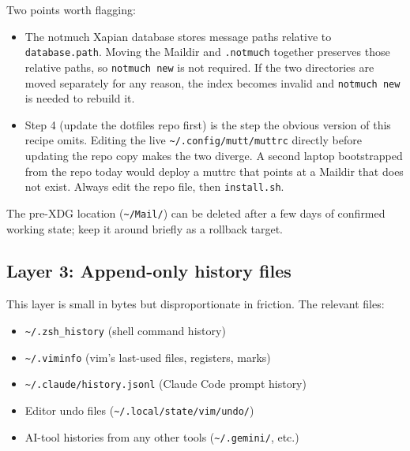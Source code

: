 \documentclass[
  11pt,
  letterpaper,
  DIV=11,
  numbers=noendperiod]{scrartcl}
\newenvironment{Shaded}{\begin{snugshade}}{\end{snugshade}}
\newcommand{\CommentTok}[1]{\textcolor[rgb]{0.37,0.37,0.37}{#1}}
\newcommand{\DataTypeTok}[1]{\textcolor[rgb]{0.68,0.00,0.00}{#1}}
\newcommand{\ExtensionTok}[1]{\textcolor[rgb]{0.00,0.23,0.31}{#1}}
\newcommand{\NormalTok}[1]{\textcolor[rgb]{0.00,0.23,0.31}{#1}}
\newcommand{\StringTok}[1]{\textcolor[rgb]{0.13,0.47,0.30}{#1}}
\newcommand{\VariableTok}[1]{\textcolor[rgb]{0.07,0.07,0.07}{#1}}
\providecommand{\tightlist}{%
  \setlength{\itemsep}{0pt}\setlength{\parskip}{0pt}}\usepackage{longtable,booktabs,array}
\begin{document}
\begin{Shaded}
\end{Shaded}

Two points worth flagging:

\begin{itemize}
\tightlist
\item
  The notmuch Xapian database stores message paths relative to
  \texttt{database.path}. Moving the Maildir and \texttt{.notmuch}
  together preserves those relative paths, so \texttt{notmuch\ new} is
  not required. If the two directories are moved separately for any
  reason, the index becomes invalid and \texttt{notmuch\ new} is needed
  to rebuild it.
\item
  Step 4 (update the dotfiles repo first) is the step the obvious
  version of this recipe omits. Editing the live
  \texttt{\textasciitilde{}/.config/mutt/muttrc} directly before
  updating the repo copy makes the two diverge. A second laptop
  bootstrapped from the repo today would deploy a muttrc that points at
  a Maildir that does not exist. Always edit the repo file, then
  \texttt{install.sh}.
\end{itemize}

The pre-XDG location (\texttt{\textasciitilde{}/Mail/}) can be deleted
after a few days of confirmed working state; keep it around briefly as a
rollback target.

\subsection{Layer 3: Append-only history
files}\label{layer-3-append-only-history-files}

This layer is small in bytes but disproportionate in friction. The
relevant files:

\begin{itemize}
\tightlist
\item
  \texttt{\textasciitilde{}/.zsh\_history} (shell command history)
\item
  \texttt{\textasciitilde{}/.viminfo} (vim's last-used files, registers,
  marks)
\item
  \texttt{\textasciitilde{}/.claude/history.jsonl} (Claude Code prompt
  history)
\item
  Editor undo files (\texttt{\textasciitilde{}/.local/state/vim/undo/})
\item
  AI-tool histories from any other tools
  (\texttt{\textasciitilde{}/.gemini/}, etc.)
\end{itemize}
\end{document}
